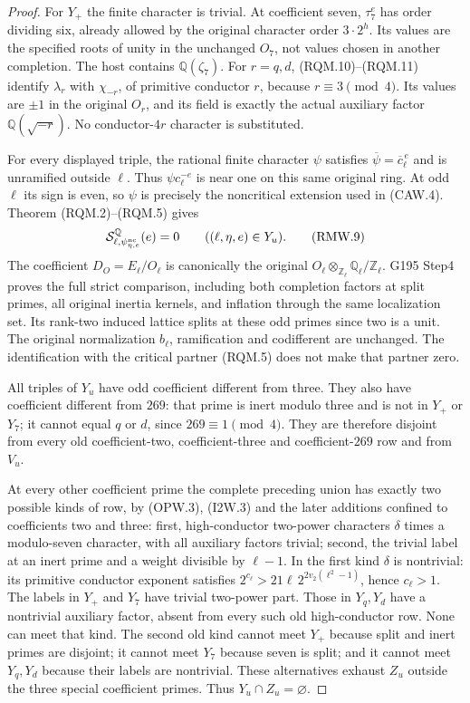 \begin{proof}
For $Y_+$ the finite character is trivial. At coefficient seven,
$\tau_7^e$ has order dividing six, already allowed by the original
character order $3\cdot2^h$. Its values are the specified roots
of unity in the unchanged $O_7$, not values chosen in another
completion. The host contains $\mathbb Q(\zeta_7)$.
For $r=q,d$, (RQM.10)--(RQM.11) identify $\lambda_r$ with
$\chi_{-r}$, of primitive conductor $r$, because $r\equiv3\pmod4$.
Its values are $\pm1$ in the original $O_r$, and its field is
exactly the actual auxiliary factor $\mathbb Q(\sqrt{-r})$.
No conductor-$4r$ character is substituted.

For every displayed triple, the rational finite character $\psi$
satisfies $\overline\psi=\overline c_\ell^{\,e}$ and is unramified
outside $\ell$. Thus $\psi c_\ell^{-e}$ is near one on this same
original ring. At odd $\ell$ its sign is even, so $\psi$ is
precisely the noncritical extension used in (CAW.4).
Theorem (RQM.2)--(RQM.5) gives
\[
             \mathcal S^{\mathbb Q}_{\ell,\psi_{\eta,e}^{\rm nc}}(e)=0
                     \qquad((\ell,\eta,e)\in Y_u).
 \tag{RMW.9}
\]
The coefficient $D_O=E_\ell/O_\ell$ is canonically the original
$O_\ell\otimes_{\mathbb Z_\ell}\mathbb Q_\ell/\mathbb Z_\ell$.
G195 Step4 proves the full strict comparison, including both
completion factors at split primes, all original inertia kernels,
and inflation through the same localization set. Its rank-two
induced lattice splits at these odd primes since two is a unit.
The original normalization $b_\ell$, ramification and codifferent
are unchanged. The identification with the critical partner
(RQM.5) does not make that partner zero.

All triples of $Y_u$ have odd coefficient different from three.
They also have coefficient different from $269$: that prime is
inert modulo three and is not in $Y_+$ or $Y_7$; it cannot equal
$q$ or $d$, since $269\equiv1\pmod4$.
They are therefore disjoint from every old coefficient-two,
coefficient-three and coefficient-$269$ row and from $V_u$.

At every other coefficient prime the complete preceding union
has exactly two possible kinds of row, by (OPW.3), (I2W.3) and
the later additions confined to coefficients two and three:
first, high-conductor two-power characters $\delta$ times a
modulo-seven character, with all auxiliary factors trivial;
second, the trivial label at an inert prime and a weight divisible
by $\ell-1$. In the first kind $\delta$ is nontrivial: its
primitive conductor exponent satisfies
$2^{c_\ell}>21\ell\,2^{2v_2(\ell^2-1)}$, hence $c_\ell>1$.
The labels in $Y_+$ and $Y_7$ have trivial two-power part.
Those in $Y_q,Y_d$ have a nontrivial auxiliary factor, absent
from every such old high-conductor row. None can meet that kind.
The second old kind cannot meet $Y_+$ because split and inert
primes are disjoint; it cannot meet $Y_7$ because seven is split;
and it cannot meet $Y_q,Y_d$ because their labels are nontrivial.
These alternatives exhaust $Z_u$ outside the three special
coefficient primes. Thus $Y_u\cap Z_u=\varnothing$.


\end{proof}
